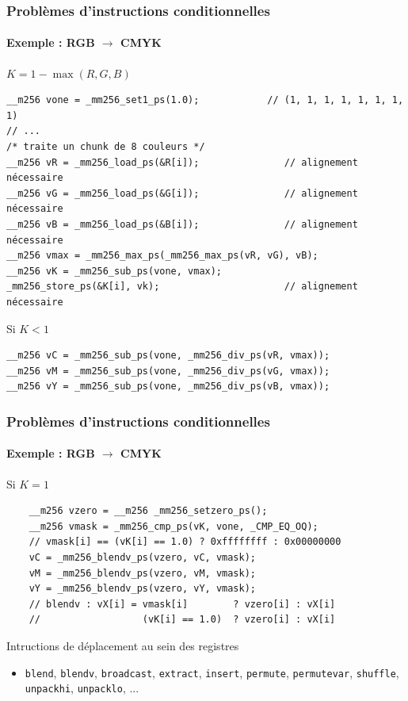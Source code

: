 \documentclass[xcolor={x11names,svgnames}]{beamer}
\begin{document}

\begin{frame}[fragile=singleslide]
  \frametitle{Problèmes d'instructions conditionnelles}
  \framesubtitle{Exemple : RGB $\rightarrow$ CMYK}

  \begin{block}{$K = 1 - \max(R, G, B)$}
\begin{verbatim}
__m256 vone = _mm256_set1_ps(1.0);            // (1, 1, 1, 1, 1, 1, 1, 1)
// ...
/* traite un chunk de 8 couleurs */
__m256 vR = _mm256_load_ps(&R[i]);               // alignement nécessaire
__m256 vG = _mm256_load_ps(&G[i]);               // alignement nécessaire
__m256 vB = _mm256_load_ps(&B[i]);               // alignement nécessaire
__m256 vmax = _mm256_max_ps(_mm256_max_ps(vR, vG), vB);
__m256 vK = _mm256_sub_ps(vone, vmax);
_mm256_store_ps(&K[i], vk);                      // alignement nécessaire
\end{verbatim}
\end{block}

  \begin{alertblock}{Si $K < 1$}
\begin{verbatim}
__m256 vC = _mm256_sub_ps(vone, _mm256_div_ps(vR, vmax));
__m256 vM = _mm256_sub_ps(vone, _mm256_div_ps(vG, vmax));
__m256 vY = _mm256_sub_ps(vone, _mm256_div_ps(vB, vmax));
\end{verbatim}
  \end{alertblock}  
\end{frame}


\begin{frame}[fragile=singleslide]
  \frametitle{Problèmes d'instructions conditionnelles}
  \framesubtitle{Exemple : RGB $\rightarrow$ CMYK}

  \begin{exampleblock}{Si $K = 1$}
\begin{verbatim}
    __m256 vzero = __m256 _mm256_setzero_ps();
    __m256 vmask = _mm256_cmp_ps(vK, vone, _CMP_EQ_OQ);
    // vmask[i] == (vK[i] == 1.0) ? 0xffffffff : 0x00000000 
    vC = _mm256_blendv_ps(vzero, vC, vmask);
    vM = _mm256_blendv_ps(vzero, vM, vmask);
    vY = _mm256_blendv_ps(vzero, vY, vmask);
    // blendv : vX[i] = vmask[i]        ? vzero[i] : vX[i]
    //                  (vK[i] == 1.0)  ? vzero[i] : vX[i]   
\end{verbatim}
  \end{exampleblock}

  \begin{block}{Intructions de déplacement au sein des registres}
  \begin{itemize}
  \item \texttt{blend}, \texttt{blendv}, \texttt{broadcast}, \texttt{extract}, \texttt{insert}, \texttt{permute},  \texttt{permutevar}, \texttt{shuffle}, \texttt{unpackhi}, \texttt{unpacklo}, ...
  \end{itemize}
\end{block}
\end{frame}
\end{document}
